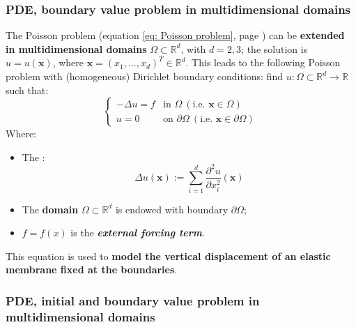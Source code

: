 \subsubsection{PDE, boundary value problem in multidimensional domains}

The Poisson problem (equation \ref{eq: Poisson problem}, page \pageref{eq: Poisson problem}) can be \textbf{extended in multidimensional domains} $\Omega \subset \mathbb{R}^{d}$, with $d = 2, 3$; the solution is $u = u\left(\mathbf{x}\right)$, where $\mathbf{x} = \left(x_{1}, \dots, x_{d}\right)^{T} \in \mathbb{R}^{d}$. This leads to the following Poisson problem with (homogeneous) Dirichlet boundary conditions: find $u: \Omega \subset \mathbb{R}^{d} \rightarrow \mathbb{R}$ such that:
\begin{equation}
    \begin{cases}
        -\Delta u = f   & \text{in } \Omega \: \left(\text{i.e. } \mathbf{x} \in \Omega\right) \\
        u = 0           & \text{on } \partial\Omega \: \left(\text{i.e. } \mathbf{x} \in \partial\Omega\right)
    \end{cases}
\end{equation}
Where:
\begin{itemize}
    \item The :
    \begin{equation*}
        \Delta u \left(\mathbf{x}\right) := \displaystyle\sum_{i=1}^{d} \dfrac{\partial^{2} u}{\partial x_{i}^{2}}\left(\mathbf{x}\right)
    \end{equation*}

    \item The \textbf{domain} $\Omega \subset \mathbb{R}^{d}$ is endowed with boundary $\partial \Omega$;

    \item $f = f\left(x\right)$ is the \emph{\textbf{external forcing term}}.
\end{itemize}
This equation is used  to \textbf{model the vertical displacement of an elastic membrane fixed at the boundaries}.

\longline

\subsubsection{PDE, initial and boundary value problem in multidimensional domains}


